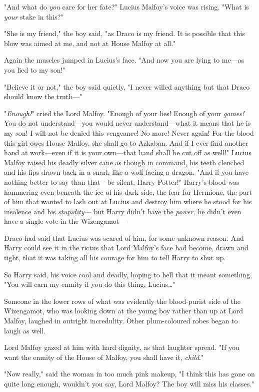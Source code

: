"And what do \emph{you} care for her fate?" Lucius Malfoy's voice was rising.
"What is \emph{your} stake in this?"

"She is my friend," the boy said, "as Draco is my friend. It is possible that
this blow was aimed at me, and not at House Malfoy at all."

Again the muscles jumped in Lucius's face. "And now you are lying to me---as
you lied to my son!"

"Believe it or not," the boy said quietly, "I never willed anything but that
Draco should know the truth---"

"\emph{Enough!}" cried the Lord Malfoy. "Enough of your lies! Enough of your
\emph{games!} You do not understand---you would never understand---what it
means that he is my son! I will not be denied this vengeance! No more! Never
again! For the blood this girl owes House Malfoy, she shall go to Azkaban. And
if I ever find another hand at work---even if it is your own---that hand shall
be cut off as well!" Lucius Malfoy raised his deadly silver cane as though in
command, his teeth clenched and his lips drawn back in a snarl, like a wolf
facing a dragon. "And if you have nothing better to say than that---be silent,
Harry Potter!"
\later
Harry's blood was hammering even beneath the ice of his dark side, the fear for
Hermione, the part of him that wanted to lash out at Lucius and destroy him
where he stood for his insolence and his \emph{stupidity---} but Harry didn't
have the \emph{power,} he didn't even have a single vote in the Wizengamot---

Draco had said that Lucius was scared of him, for some unknown reason. And
Harry could see it in the rictus that Lord Malfoy's face had become, drawn and
tight, that it was taking all his courage for him to tell Harry to shut up.

So Harry said, his voice cool and deadly, hoping to hell that it meant
something, "You will earn my enmity if you do this thing, Lucius{\ldots}"

Someone in the lower rows of what was evidently the blood-purist side of the
Wizengamot, who was looking down at the young boy rather than up at Lord
Malfoy, laughed in outright incredulity. Other plum-coloured robes began to
laugh as well.

Lord Malfoy gazed at him with hard dignity, as that laughter spread. "If you
want the enmity of the House of Malfoy, you shall have it, \emph{child}."

"Now really," said the woman in too much pink makeup, "I think this has gone on
quite long enough, wouldn't you say, Lord Malfoy? The boy will miss his
classes."

